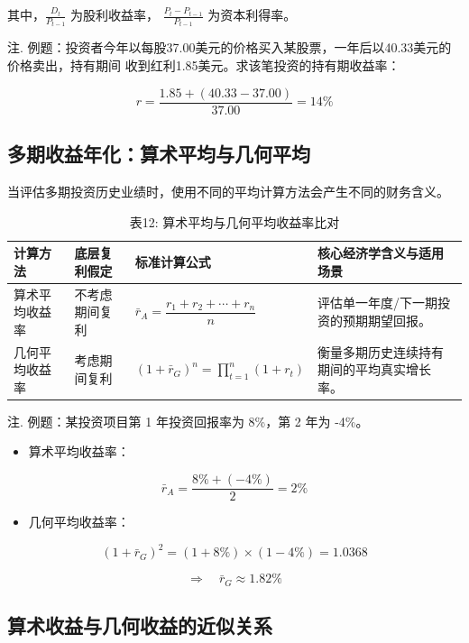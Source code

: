 \documentclass[lang=cn,10pt,color=blue]{elegantbook}
\begin{document}
其中，$\frac { D _ { t } } { P _ { t - 1 } }$ 为股利收益率， $\frac { P _ { t } - P _ { t - 1 } } { P _ { t - 1 } }$ 为资本利得率。 

注. 例题：投资者今年以每股37.00美元的价格买入某股票，一年后以40.33美元的价格卖出，持有期间 收到红利1.85美元。求该笔投资的持有期收益率： 

$$
r = \frac {1 . 8 5 + (4 0 . 3 3 - 3 7 . 0 0)}{3 7 . 0 0} = 14 \%
$$

\subsection{多期收益年化：算术平均与几何平均}

当评估多期投资历史业绩时，使用不同的平均计算方法会产生不同的财务含义。 

\begin{table}[ht]
  \centering
  \caption{表12: 算术平均与几何平均收益率比对}
  \renewcommand{\arraystretch}{1.4}
\begin{tabularx}{\textwidth}{llYY}
  \toprule
  计算方法 & 底层复利假定 & 标准计算公式 & 核心经济学含义与适用场景 \\
  \midrule
  算术平均收益率 & 不考虑期间复利 & $\bar{r}_{A} = \dfrac{r_{1} + r_{2} + \cdots + r_{n}}{n}$ & 评估单一年度/下一期投资的预期期望回报。 \\
  几何平均收益率 & 考虑期间复利 & $(1 + \bar{r}_{G})^{n} = \prod_{t=1}^{n}(1 + r_{t})$ & 衡量多期历史连续持有期间的平均真实增长率。 \\
  \bottomrule
\end{tabularx}
\end{table}

注. 例题：某投资项目第 1 年投资回报率为 8\%，第 2 年为 -4\%。 

\begin{itemize}
  \item 算术平均收益率：
\end{itemize}

$$
\bar {r} _ {A} = \frac {8 \% + (- 4 \%)}{2} = 2 \%
$$

\begin{itemize}
  \item 几何平均收益率：
\end{itemize}

$$
(1 + \bar {r} _ {G}) ^ {2} = (1 + 8 \%) \times (1 - 4 \%) = 1. 0 3 6 8
$$

$$
\Rightarrow \quad \boxed{\bar{r}_{G}\approx 1.82\%}
$$

\subsection{算术收益与几何收益的近似关系}
\end{document}
